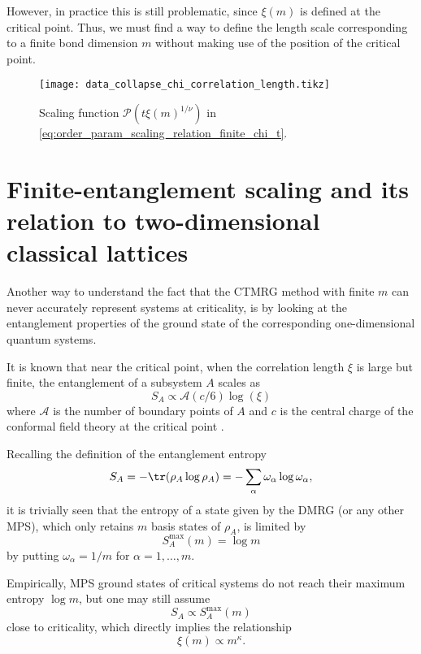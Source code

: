 However, in practice this is still problematic, since $\xi(m)$ is defined at the critical point. Thus, we must find a
way to define the length scale corresponding to a finite bond dimension $m$ without making use of the position of the
critical point.

\begin{figure}
  \texttt{[image: data\_collapse\_chi\_correlation\_length.tikz]}
  \caption{Scaling function $\mathcal{P}(t \xi(m)^{1/\nu})$ in
  \autoref{eq:order_param_scaling_relation_finite_chi_t}.}\label{fig:data_collapse_chi_correlation_length}
\end{figure}

\section{Finite-entanglement scaling and its relation to two-dimensional classical lattices}

Another way to understand the fact that the CTMRG method with finite $m$ can never accurately represent systems at
criticality, is by looking at the entanglement properties of the ground state of the corresponding one-dimensional
quantum systems.

It is known that near the critical point, when the correlation length $\xi$ is large but finite, the entanglement of a
subsystem $A$ scales as
\begin{equation}\label{eq:entropy_scaling_near_criticality}
  S_A \propto \mathcal{A}(c/6)\log(\xi)
\end{equation}
where $\mathcal{A}$ is the number of boundary points of $A$ and $c$ is the central charge of the conformal field theory
at the critical point \cite{calabrese2004entanglement, vidal2003entanglement, ercolessi2010exact}.

Recalling the definition of the entanglement entropy
\begin{equation}
  S_A = - \tr(\rho_A \log \rho_A) = - \sum_{\alpha} \omega_{\alpha} \log \omega_{\alpha},
\end{equation}
it is trivially seen that the entropy of a state given by the DMRG (or any other MPS), which only
retains $m$ basis states of $\rho_A$, is limited by
\begin{equation}
  S^{\text{max}}_A(m) = \log m
\end{equation}
by putting $\omega_{\alpha} = 1/m$ for $\alpha = 1, \dots, m$.

Empirically, MPS ground states of critical systems do not reach their maximum entropy $\log m$, but one may still assume
\begin{equation}
  S_A \propto S^{\text{max}}_A(m)
\end{equation}
close to criticality, which directly implies the relationship
\begin{equation}\label{eq:xi_propto_kappa}
  \xi(m) \propto m^{\kappa}.
\end{equation}

